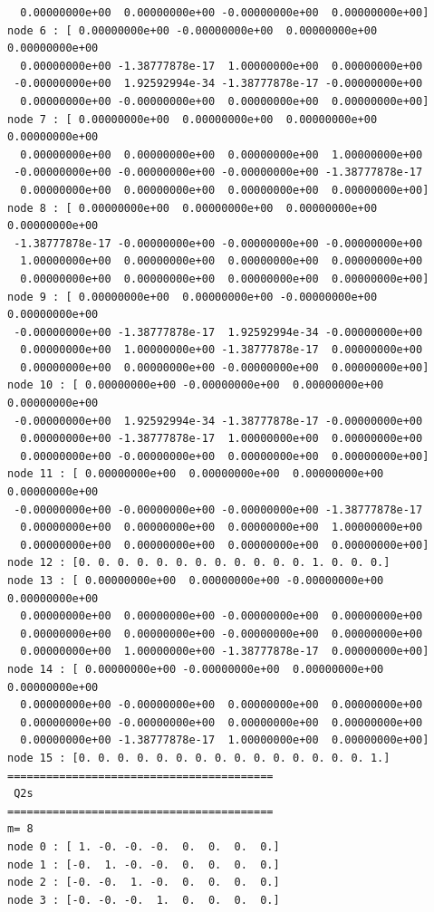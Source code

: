 \begin{scriptsize}
\begin{verbatim}
  0.00000000e+00  0.00000000e+00 -0.00000000e+00  0.00000000e+00]
node 6 : [ 0.00000000e+00 -0.00000000e+00  0.00000000e+00  0.00000000e+00
  0.00000000e+00 -1.38777878e-17  1.00000000e+00  0.00000000e+00
 -0.00000000e+00  1.92592994e-34 -1.38777878e-17 -0.00000000e+00
  0.00000000e+00 -0.00000000e+00  0.00000000e+00  0.00000000e+00]
node 7 : [ 0.00000000e+00  0.00000000e+00  0.00000000e+00  0.00000000e+00
  0.00000000e+00  0.00000000e+00  0.00000000e+00  1.00000000e+00
 -0.00000000e+00 -0.00000000e+00 -0.00000000e+00 -1.38777878e-17
  0.00000000e+00  0.00000000e+00  0.00000000e+00  0.00000000e+00]
node 8 : [ 0.00000000e+00  0.00000000e+00  0.00000000e+00  0.00000000e+00
 -1.38777878e-17 -0.00000000e+00 -0.00000000e+00 -0.00000000e+00
  1.00000000e+00  0.00000000e+00  0.00000000e+00  0.00000000e+00
  0.00000000e+00  0.00000000e+00  0.00000000e+00  0.00000000e+00]
node 9 : [ 0.00000000e+00  0.00000000e+00 -0.00000000e+00  0.00000000e+00
 -0.00000000e+00 -1.38777878e-17  1.92592994e-34 -0.00000000e+00
  0.00000000e+00  1.00000000e+00 -1.38777878e-17  0.00000000e+00
  0.00000000e+00  0.00000000e+00 -0.00000000e+00  0.00000000e+00]
node 10 : [ 0.00000000e+00 -0.00000000e+00  0.00000000e+00  0.00000000e+00
 -0.00000000e+00  1.92592994e-34 -1.38777878e-17 -0.00000000e+00
  0.00000000e+00 -1.38777878e-17  1.00000000e+00  0.00000000e+00
  0.00000000e+00 -0.00000000e+00  0.00000000e+00  0.00000000e+00]
node 11 : [ 0.00000000e+00  0.00000000e+00  0.00000000e+00  0.00000000e+00
 -0.00000000e+00 -0.00000000e+00 -0.00000000e+00 -1.38777878e-17
  0.00000000e+00  0.00000000e+00  0.00000000e+00  1.00000000e+00
  0.00000000e+00  0.00000000e+00  0.00000000e+00  0.00000000e+00]
node 12 : [0. 0. 0. 0. 0. 0. 0. 0. 0. 0. 0. 0. 1. 0. 0. 0.]
node 13 : [ 0.00000000e+00  0.00000000e+00 -0.00000000e+00  0.00000000e+00
  0.00000000e+00  0.00000000e+00 -0.00000000e+00  0.00000000e+00
  0.00000000e+00  0.00000000e+00 -0.00000000e+00  0.00000000e+00
  0.00000000e+00  1.00000000e+00 -1.38777878e-17  0.00000000e+00]
node 14 : [ 0.00000000e+00 -0.00000000e+00  0.00000000e+00  0.00000000e+00
  0.00000000e+00 -0.00000000e+00  0.00000000e+00  0.00000000e+00
  0.00000000e+00 -0.00000000e+00  0.00000000e+00  0.00000000e+00
  0.00000000e+00 -1.38777878e-17  1.00000000e+00  0.00000000e+00]
node 15 : [0. 0. 0. 0. 0. 0. 0. 0. 0. 0. 0. 0. 0. 0. 0. 1.]
=========================================
 Q2s
=========================================
m= 8
node 0 : [ 1. -0. -0. -0.  0.  0.  0.  0.]
node 1 : [-0.  1. -0. -0.  0.  0.  0.  0.]
node 2 : [-0. -0.  1. -0.  0.  0.  0.  0.]
node 3 : [-0. -0. -0.  1.  0.  0.  0.  0.]

\end{verbatim}
\end{scriptsize}
